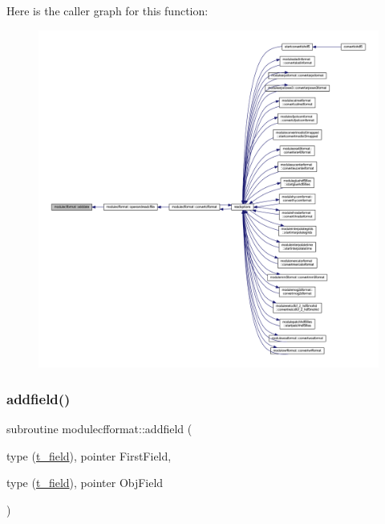 Here is the caller graph for this function\+:\nopagebreak
\begin{figure}[H]
\begin{center}
\leavevmode
\includegraphics[width=350pt]{namespacemodulecfformat_ad6fa7957e7e1de3c2faa57ac769c05bd_icgraph}
\end{center}
\end{figure}
\mbox{\label{namespacemodulecfformat_a86156fe637bfdd6ff49e6bce5f187595}} 
\subsubsection{\texorpdfstring{addfield()}{addfield()}}
{\footnotesize\ttfamily subroutine modulecfformat\+::addfield (\begin{DoxyParamCaption}\item[{type (\mbox{\hyperlink{structmodulecfformat_1_1t__field}{t\+\_\+field}}), pointer}]{First\+Field,  }\item[{type (\mbox{\hyperlink{structmodulecfformat_1_1t__field}{t\+\_\+field}}), pointer}]{Obj\+Field }\end{DoxyParamCaption})\hspace{0.3cm}{\ttfamily [private]}}

